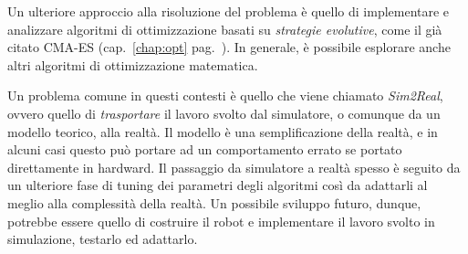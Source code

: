 Un ulteriore approccio alla risoluzione del problema è quello di implementare e analizzare algoritmi di
ottimizzazione basati su \textit{strategie evolutive}, come il già citato CMA-ES (cap.~\ref{chap:opt}
pag.~\pageref{chap:opt}). \cite{lection22} In generale, è possibile esplorare anche altri algoritmi di
ottimizzazione matematica.

\bigskip
\noindent Un problema comune in questi contesti è quello che viene chiamato \textit{Sim2Real}, ovvero
quello di \textit{trasportare} il lavoro svolto dal simulatore, o comunque da un modello teorico, alla
realtà. Il modello è una semplificazione della realtà, e in alcuni casi questo può portare ad un
comportamento errato se portato direttamente in hardward. Il passaggio da simulatore a realtà spesso è
seguito da un ulteriore fase di tuning dei parametri degli algoritmi così da adattarli al meglio alla
complessità della realtà. Un possibile sviluppo futuro, dunque, potrebbe essere quello di costruire il
robot e implementare il lavoro svolto in simulazione, testarlo ed adattarlo.
